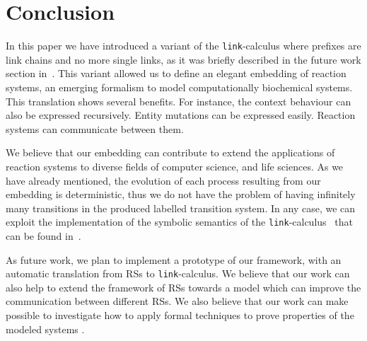 
\section{Conclusion}\label{sec:conclusion}

In this paper we have introduced a variant of the {\tt link}-calculus
where prefixes are link chains and no more single links, as it was 
briefly described in the future work section in~\cite{BBB17}.
This variant allowed us to define 
an elegant embedding of reaction systems,
an emerging formalism to model computationally biochemical systems.
This translation shows several benefits.
For instance, the context behaviour can also be expressed recursively. 
Entity mutations can be expressed easily. Reaction systems can
communicate between them.

We believe that our embedding can contribute to extend the applications
of reaction systems to diverse fields of computer science, and life
sciences.
As we have already mentioned, the evolution of each process resulting from our embedding 
is deterministic, thus we do not have the problem of having infinitely many transitions
in the produced labelled transition system. In any case, we can exploit the implementation of  the symbolic semantics of the {\tt link}-calculus~\cite{BrodoO17} that can be found in~\cite{tool}.


As future work, we plan to implement a prototype of our framework,
with an automatic translation from RSs to  {\tt link}-calculus. 
We believe that our work can also help to extend the framework
of RSs towards a model which can improve the communication
between different RSs. We also believe that our work can make 
possible to investigate how to apply formal techniques to prove 
properties of the
modeled systems \cite{CFHOT15,OCHF16,BBGLBH2017}.
